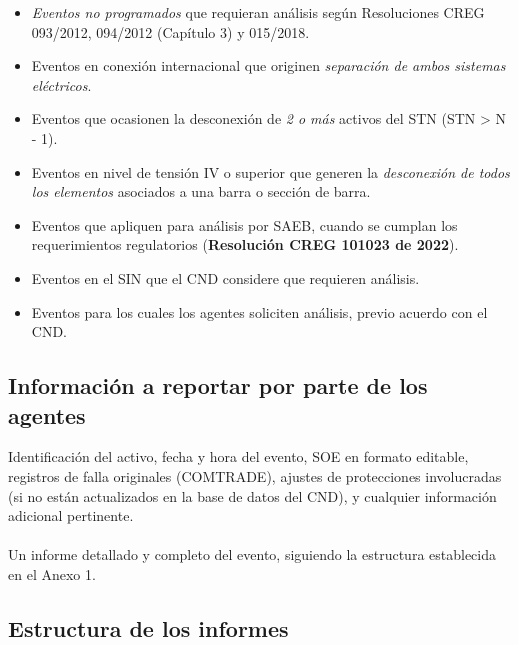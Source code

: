 \documentclass[a5paper]{book}%
\begin{document}
\begin{itemize}
	\item\textit{ Eventos no programados} que requieran análisis según Resoluciones CREG 093/2012, 094/2012 (Capítulo 3) y 015/2018.
	\item Eventos en conexión internacional que originen \textit{separación de ambos sistemas eléctricos}.
	
	\item Eventos que ocasionen la desconexión de \textit{2 o más} activos del STN (STN > N - 1).
	
	\item Eventos en nivel de tensión IV o superior que generen la \textit{desconexión de todos los elementos} asociados a una barra o sección de barra.
	
	\item Eventos que apliquen para análisis por \ac{SAEB}, cuando se cumplan los requerimientos regulatorios (\textbf{Resolución CREG 101023 de 2022}).
	
	\item Eventos en el SIN que el CND considere que requieren análisis.
	
	\item Eventos para los cuales los agentes soliciten análisis, previo acuerdo con el CND.
	
\end{itemize}

\subsection{Información a reportar por parte de los agentes}

Identificación del activo, fecha y hora del evento, \ac{SOE} en formato editable, registros de falla originales (COMTRADE), ajustes de protecciones involucradas (si no están actualizados en la base de datos del CND), y cualquier información adicional pertinente.\\\\
Un informe detallado y completo del evento, siguiendo la estructura establecida en el Anexo 1.

\subsection{Estructura de los informes}
\end{document}

